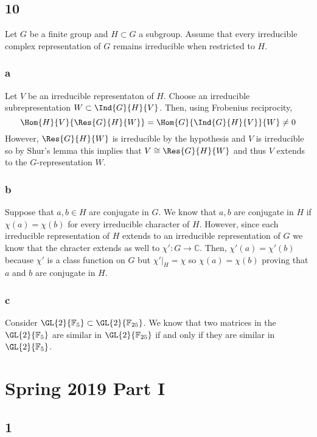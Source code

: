 \documentclass[12pt]{article}
\renewcommand{\C}{\mathbb{C}}
\renewcommand{\F}{\mathbb{F}}
\begin{document}
\subsection{10}

Let $G$ be a finite group and $H \subset G$ a subgroup. Assume that every irreducible complex representation of $G$ remains irreducible when restricted to $H$.

\subsubsection{a}

Let $V$ be an irreducible representaton of $H$. Choose an irreducible subrepresentation $W \subset \Ind{G}{H}{V}$. Then, using Frobenius reciprocity,
\[ \Hom{H}{V}{\Res{G}{H}{W}} = \Hom{G}{\Ind{G}{H}{V}}{W} \neq 0 \]
However, $\Res{G}{H}{W}$ is irreducible by the hypothesis and $V$ is irreducible so by Shur's lemma this implies that $V \cong \Res{G}{H}{W}$ and thus $V$ extends to the $G$-representation $W$.

\subsubsection{b}

Suppose that $a, b \in H$ are conjugate in $G$. We know that $a, b$ are conjugate in $H$ if $\chi(a) = \chi(b)$ for every irreducible character of $H$. However, since each irreducible representation of $H$ extends to an irreducible representation of $G$ we know that the chracter extends as well to $\chi' : G \to \C$. Then, $\chi'(a) = \chi'(b)$ because $\chi'$ is a class function on $G$ but $\chi'|_H = \chi$ so $\chi(a) = \chi(b)$ proving that $a$ and $b$ are conjugate in $H$.

\subsubsection{c}

Consider $\GL{2}{\F_5} \subset \GL{2}{\F_{25}}$. We know that two matrices in the $\GL{2}{\F_5}$ are similar in $\GL{2}{\F_{25}}$ if and only if they are similar in $\GL{2}{\F_5}$. 

\section{Spring 2019 Part I}

\subsection{1}
\end{document}
